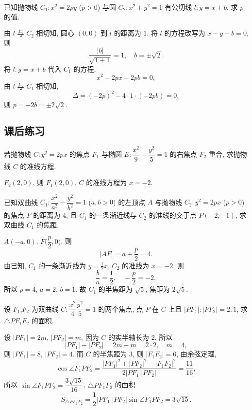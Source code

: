 \begin{exercise}
    已知抛物线 $C_1\colon x^2=2py$ ($p>0$) 与圆 $C_2\colon x^2 +y^2 =1$ 有公切线 $l\colon y=x+b$, 求 $p$ 的值.
\end{exercise}
\beginsolution
    由 $l$ 与 $C_2$ 相切知, 圆心 $(0,0)$ 到 $l$ 的距离为 $1$. 将 $l$ 的方程改写为 $x-y+b=0$, 则
    \[\frac{|b|}{\sqrt{1+1}}= 1,\quad b=\pm\sqrt2.\]
    将 $l\colon y=x+b$ 代入 $C_1$ 的方程, 
    \[x^2- 2px- 2pb=0,\]
    由 $l$ 与 $C_1$ 相切知,
    \[\Delta= (-2p)^2- 4\cdot 1\cdot(-2pb)= 0,\]
    则 $p= -2b= \pm2\sqrt2$.
\endsolution

\subsection{课后练习}
\begin{exercise}
    若抛物线 $C\colon y^2 =2px$ 的焦点 $F_1$ 与椭圆 $E\colon \dfrac{x^2}9+ \dfrac{y^2}5=1$ 的右焦点 $F_2$ 重合, 求抛物线 $C$ 的准线方程.
\end{exercise}
\beginsolution
    $F_2(2,0)$, 则 $F_1(2,0)$, $C$ 的准线方程为 $x=-2$.
\endsolution
    
\begin{exercise}
    已知双曲线 $C_1\colon \dfrac{x^2}{a^2}- \dfrac{y^2}{b^2}=1$ ($a,b>0$) 的左顶点 $A$ 与抛物线 $C_2\colon y^2 =2px$ ($p>0$) 的焦点 $F$ 的距离为 $4$, 且 $C_1$ 的一条渐近线与 $C_2$ 的准线的交于点 $P(-2,-1)$, 求双曲线 $C_1$ 的焦距.
\end{exercise}
\beginsolution
    $A(-a,0)$, $F\biggl(\dfrac{p}2,0\biggr)$, 则
    \[|AF|= a+\frac{p}2= 4.\]
    由已知, $C_1$ 的一条渐近线为 $y= \frac12x$, $C_2$ 的准线为 $x=-2$, 则
    \[\frac{b}a= \frac12,\quad -\frac{p}2= -2,\]
    所以 $p=4$, $a=2$, $b=1$. 故 $C_1$ 的半焦距为 $\sqrt5$, 焦距为 $2\sqrt5$.
\endsolution

\begin{exercise}
    设 $F_1$,$F_2$ 为双曲线 $C\colon \dfrac{x^2}4 \dfrac{y^2}5=1$ 的两个焦点, 点 $P$ 在 $C$ 上且 $|PF_1|:|PF_2|= 2:1$, 求 $\triangle PF_1F_2$ 的面积.
\end{exercise}
\beginsolution
    设 $|PF_1|= 2m$, $|PF_2|= m$. 因为 $C$ 的实半轴长为 $2$, 所以
    \[|PF_1|- |PF_2|= 2m-m= 2\cdot 2,\quad m=4,\]
    则 $|PF_1|= 8$, $|PF_2|= 4$. 而 $C$ 的半焦距为 $3$, 则 $|F_1F_2|= 6$, 由余弦定理, 
    \[\cos\angle F_1PF_2
    = \frac{|PF_1|^2+|PF_2|^2- |F_1F_2|^2}{2|PF_1||PF_2|}
    = \frac{11}{16},\]
    所以 $\sin\angle F_1PF_2= \dfrac{3\sqrt{15}}{16}$, $\triangle PF_1F_2$ 的面积
    \[S_{\triangle PF_1F_2}
    = \frac12|PF_1||PF_2|\sin\angle F_1PF_2
    = 3\sqrt{15}.\]
\endsolution

